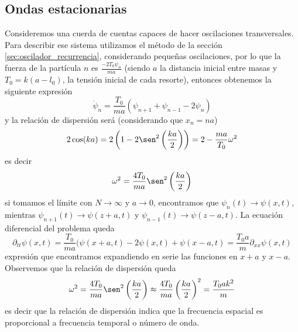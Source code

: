 \documentclass[a4paper]{article}
\numberwithin{equation}{section}
\begin{document}
	    \subsection{Ondas estacionarias}
			Consideremos una cuerda de cuentas capaces de hacer oscilaciones transversales. Para describir ese sistema utilizamos el método de la sección \ref{sec:oscilador_recurrencia}, considerando pequeñas oscilaciones, por lo que la fuerza de la partícula $n$ es $\frac{- 2 T_0 \psi_n}{m a}$ (siendo $a$ la distancia inicial entre masas y $T_0 = k (a - l_0)$, la tensión inicial de cada resorte), entonces obtenemos la siguiente expresión
			\begin{equation*}
				\ddot{\psi}_n = \frac{T_0}{m a} (\psi_{n+1} + \psi_{n-1} - 2 \psi_n)
			\end{equation*}
			y la relación de dispersión será (considerando que $x_n = n a$)
			\begin{equation*}
				2 \cos(k a) = 2 \left(1 - 2 \sen^2\left(\frac{k a}{2}\right)\right) = 2 - \frac{m a}{T_0} \omega^2
			\end{equation*}
			es decir
			\begin{equation*}
				\omega^2 = \frac{4 T_0}{m a} \sen^2\left(\frac{k a}{2}\right)
			\end{equation*}
			si tomamos el límite con $N \to \infty$ y $a \to 0$, encontramos que $\psi_n(t) \to \psi(x,t)$, mientras $\psi_{n+1}(t) \to \psi(z + a,t)$ y $\psi_{n-1}(t) \to \psi(z - a,t)$. La ecuación diferencial del problema queda
			\begin{equation*}
				\partial_{tt} \psi(x,t) = \frac{T_0}{m a} (\psi(x+a,t) - 2 \psi(x,t) + \psi(x-a,t) = \frac{T_0 a}{m} \partial_{xx} \psi(x,t)
			\end{equation*}
			expresión que encontramos expandiendo en serie las funciones en $x +a$ y $x-a$. Observemos que la relación de dispersión queda
			\begin{equation*}
				\omega^2 = \frac{4 T_0}{m a} \sen^2\left(\frac{k a}{2}\right) \approx \frac{4 T_0}{m a} \left(\frac{k a}{2}\right)^2 = \frac{T_0 a k^2}{m}
			\end{equation*}
			es decir que la relación de dispersión indica que la frecuencia espacial es proporcional a frecuencia temporal o número de onda.
			
\end{document}
